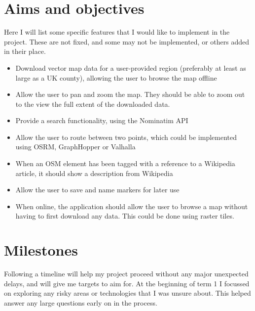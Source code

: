 \documentclass{final_report}
\begin{document}
\section{Aims and objectives}

Here I will list some specific features that I would like to implement in the project. These are not fixed, and some may not be implemented, or others added in their place.

\begin{itemize}
    \item Download vector map data for a user-provided region (preferably at least as large as a UK county), allowing the user to browse the map offline
    \item Allow the user to pan and zoom the map. They should be able to zoom out to the view the full extent of the downloaded data.
    \item Provide a search functionality, using the Nominatim API
    \item Allow the user to route between two points, which could be implemented using OSRM, GraphHopper or Valhalla
    \item When an OSM element has been tagged with a reference to a Wikipedia article, it should show a description from Wikipedia
    \item Allow the user to save and name markers for later use
    \item When online, the application should allow the user to browse a map without having to first download any data. This could be done using raster tiles.
\end{itemize}

\section{Milestones}


Following a timeline will help my project proceed without any major unexpected delays, and will give me targets to aim for. At the beginning of term 1 I focussed on exploring any risky areas or technologies that I was unsure about. This helped answer any large questions early on in the process.
\end{document}
